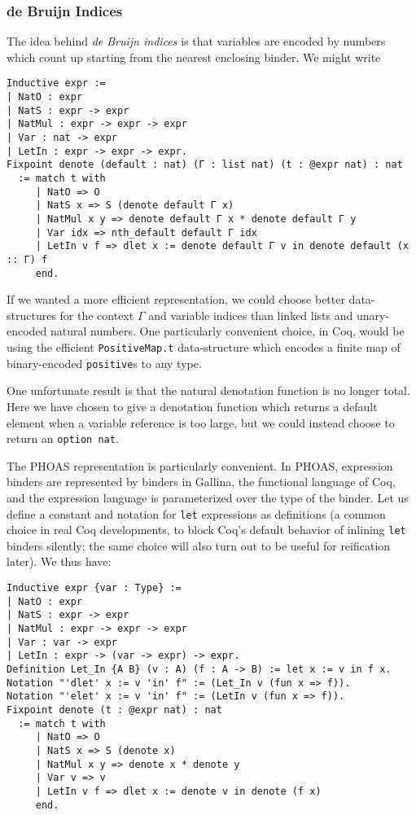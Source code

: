 \subsubsection{de Bruijn Indices} \label{sec:binders:de-bruijn}
The idea behind \emph{de Bruijn indices} is that variables are encoded by numbers which count up starting from the nearest enclosing binder.
We might write
\begin{verbatim}
Inductive expr :=
| NatO : expr
| NatS : expr -> expr
| NatMul : expr -> expr -> expr
| Var : nat -> expr
| LetIn : expr -> expr -> expr.
Fixpoint denote (default : nat) (Γ : list nat) (t : @expr nat) : nat
  := match t with
     | NatO => O
     | NatS x => S (denote default Γ x)
     | NatMul x y => denote default Γ x * denote default Γ y
     | Var idx => nth_default default Γ idx
     | LetIn v f => dlet x := denote default Γ v in denote default (x :: Γ) f
     end.
\end{verbatim}
If we wanted a more efficient representation, we could choose better data-structures for the context $\Gamma$ and variable indices than linked lists and unary-encoded natural numbers.
One particularly convenient choice, in Coq, would be using the efficient \texttt{PositiveMap.t} data-structure which encodes a finite map of binary-encoded \texttt{positive}s to any type.

One unfortunate result is that the natural denotation function is no longer total.
Here we have chosen to give a denotation function which returns a default element when a variable reference is too large, but we could instead choose to return an \texttt{option nat}.



The PHOAS representation is particularly convenient.
In PHOAS, expression binders are represented by binders in Gallina, the functional language of Coq, and the expression language is parameterized over the type of the binder.
Let us define a constant and notation for \texttt{let} expressions as definitions (a common choice in real Coq developments, to block Coq's default behavior of inlining \texttt{let} binders silently; the same choice will also turn out to be useful for reification later).
We thus have: \label{sec:phoas-expr-def}
\begin{verbatim}
Inductive expr {var : Type} :=
| NatO : expr
| NatS : expr -> expr
| NatMul : expr -> expr -> expr
| Var : var -> expr
| LetIn : expr -> (var -> expr) -> expr.
Definition Let_In {A B} (v : A) (f : A -> B) := let x := v in f x.
Notation "'dlet' x := v 'in' f" := (Let_In v (fun x => f)).
Notation "'elet' x := v 'in' f" := (LetIn v (fun x => f)).
Fixpoint denote (t : @expr nat) : nat
  := match t with
     | NatO => O
     | NatS x => S (denote x)
     | NatMul x y => denote x * denote y
     | Var v => v
     | LetIn v f => dlet x := denote v in denote (f x)
     end.
\end{verbatim}

